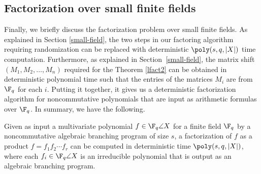 %
%
%
%
%
%
%
%
%
%
%
%
%
%
%
%
%
%
%



\subsection{Factorization over small finite fields}

Finally, we briefly discuss the factorization problem over small
finite fields.  As explained in Section \ref{small-field}, the two
steps in our factoring algorithm requiring randomization can be
replaced with deterministic $\poly(s, q, |X|)$ time
computation. Furthermore, as explained in Section~\ref{small-field},
the matrix shift $(M_1, M_2, \ldots, M_n)$ required for the Theorem
\ref{lfact2} can be obtained in deterministic polynomial time such
that the entries of the matrices $M_i$ are from $\F_q$ for each $i$.
Putting it together, it gives us a deterministic factorization
algorithm for noncommutative polynomials that are input as arithmetic
formulas over $\F_q$. In summary, we have the following.

\begin{theorem}
Given as input a multivariate polynomial $f\in\F_q\angle{X}$ for a
finite field $\F_q$ by a noncommutative algebraic branching program of size
$s$, a factorization of $f$ as a product $f=f_1f_2\cdots f_r$ can be
computed in deterministic time $\poly(s,q,|X|)$, where each
$f_i\in\F_q\angle{X}$ is an irreducible polynomial that is output as
an algebraic branching program.
\end{theorem}


